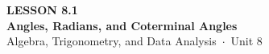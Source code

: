 \documentclass[aspectratio=169, 11pt]{beamer}
\begin{document}
{
\begin{frame}[plain]
  \vspace{2.8cm}\hspace{0.55cm}%
  \begin{minipage}{0.9\textwidth}
    {\color{goldacc}\bfseries\small LESSON 8.1}\\[0.5cm]
    {\color{white}\bfseries\LARGE Angles, Radians, and Coterminal Angles}\\[1.2cm]
    {\color{mistmid}\small Algebra, Trigonometry, and Data Analysis~$\cdot$~Unit 8}
  \end{minipage}
\end{frame}
}

\begin{frame}[t, plain]
\end{frame}
\end{document}
